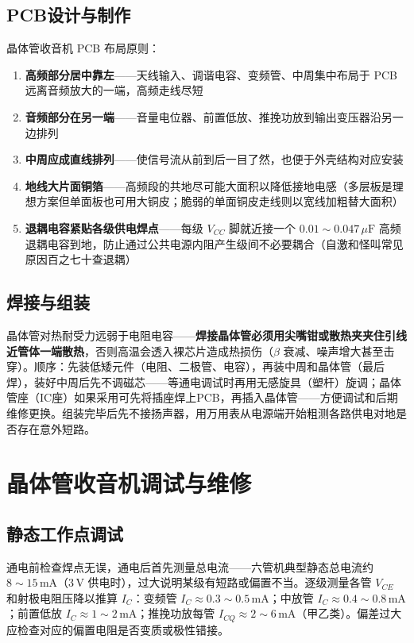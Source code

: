 \documentclass[12pt,UTF8]{ctexbook}
\begin{document}
\subsection{PCB设计与制作}

晶体管收音机 PCB 布局原则：
\begin{enumerate}
\item \textbf{高频部分居中靠左}——天线输入、调谐电容、变频管、中周集中布局于 PCB 远离音频放大的一端，高频走线尽短
\item \textbf{音频部分在另一端}——音量电位器、前置低放、推挽功放到输出变压器沿另一边排列
\item \textbf{中周应成直线排列}——使信号流从前到后一目了然，也便于外壳结构对应安装
\item \textbf{地线大片面铜箔}——高频段的共地尽可能大面积以降低接地电感（多层板是理想方案但单面板也可用大铜皮；脆弱的单面铜皮走线则以宽线加粗替大面积）
\item \textbf{退耦电容紧贴各级供电焊点}——每级 $V_{CC}$ 脚就近接一个 $0.01\sim0.047\,\mu\mathrm{F}$ 高频退耦电容到地，防止通过公共电源内阻产生级间不必要耦合（自激和怪叫常见原因百之七十查退耦）
\end{enumerate}

\subsection{焊接与组装}

晶体管对热耐受力远弱于电阻电容——\textbf{焊接晶体管必须用尖嘴钳或散热夹夹住引线近管体一端散热}，否则高温会透入裸芯片造成热损伤（$\beta$ 衰减、噪声增大甚至击穿）。顺序：先装低矮元件（电阻、二极管、电容），再装中周和晶体管（最后焊），装好中周后先不调磁芯——等通电调试时再用无感旋具（塑杆）旋调；晶体管座（IC座）如果采用可先将插座焊上PCB，再插入晶体管——方便调试和后期维修更换。组装完毕后先不接扬声器，用万用表从电源端开始粗测各路供电对地是否存在意外短路。

\section{晶体管收音机调试与维修}
\label{sec:transistor_radio_maintenance}

\subsection{静态工作点调试}

通电前检查焊点无误，通电后首先测量总电流——六管机典型静态总电流约 $8\sim15\,\mathrm{mA}$（$3\,\mathrm{V}$ 供电时），过大说明某级有短路或偏置不当。逐级测量各管 $V_{CE}$ 和射极电阻压降以推算 $I_C$：变频管 $I_C\approx0.3\sim0.5\,\mathrm{mA}$；中放管 $I_C\approx0.4\sim0.8\,\mathrm{mA}$；前置低放 $I_C\approx1\sim2\,\mathrm{mA}$；推挽功放每管 $I_{CQ}\approx2\sim6\,\mathrm{mA}$（甲乙类）。偏差过大应检查对应的偏置电阻是否变质或极性错接。
\end{document}
